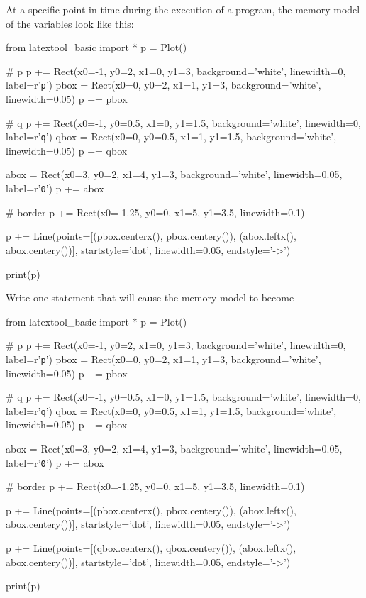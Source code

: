 \nextq
At a specific point in time during the execution of
a program, the memory model of the variables look like this:
\begin{python}
from latextool_basic import *
p = Plot()

# p
p += Rect(x0=-1, y0=2, x1=0, y1=3, background='white', linewidth=0, label=r'\texttt{p}')
pbox = Rect(x0=0, y0=2, x1=1, y1=3, background='white', linewidth=0.05)
p += pbox

# q
p += Rect(x0=-1, y0=0.5, x1=0, y1=1.5, background='white', linewidth=0, label=r'\texttt{q}')
qbox = Rect(x0=0, y0=0.5, x1=1, y1=1.5, background='white', linewidth=0.05)
p += qbox

abox = Rect(x0=3, y0=2, x1=4, y1=3, background='white', linewidth=0.05,
            label=r'\texttt{0}')
p += abox

# border
p += Rect(x0=-1.25, y0=0, x1=5, y1=3.5, linewidth=0.1)

p += Line(points=[(pbox.centerx(), pbox.centery()),
                  (abox.leftx(), abox.centery())],
          startstyle='dot', linewidth=0.05,
          endstyle='->')

print(p)
\end{python}
Write one statement that will cause the memory model to become
\begin{python}
from latextool_basic import *
p = Plot()

# p
p += Rect(x0=-1, y0=2, x1=0, y1=3, background='white', linewidth=0, label=r'\texttt{p}')
pbox = Rect(x0=0, y0=2, x1=1, y1=3, background='white', linewidth=0.05)
p += pbox

# q
p += Rect(x0=-1, y0=0.5, x1=0, y1=1.5, background='white', linewidth=0, label=r'\texttt{q}')
qbox = Rect(x0=0, y0=0.5, x1=1, y1=1.5, background='white', linewidth=0.05)
p += qbox

abox = Rect(x0=3, y0=2, x1=4, y1=3, background='white', linewidth=0.05,
            label=r'\texttt{0}')
p += abox

# border
p += Rect(x0=-1.25, y0=0, x1=5, y1=3.5, linewidth=0.1)

p += Line(points=[(pbox.centerx(), pbox.centery()),
                  (abox.leftx(), abox.centery())],
          startstyle='dot', linewidth=0.05,
          endstyle='->')

p += Line(points=[(qbox.centerx(), qbox.centery()),
                  (abox.leftx(), abox.centery())],
          startstyle='dot', linewidth=0.05,
          endstyle='->')

print(p)
\end{python}
\ANSWER
\begin{answercode}

\end{answercode}

